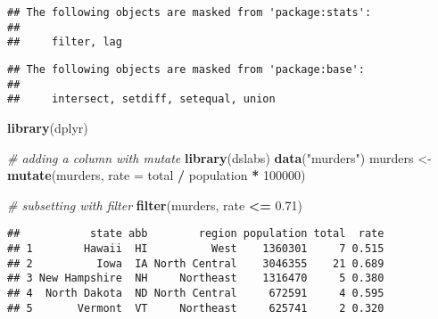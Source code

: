 \documentclass[
]{article}
\newenvironment{Shaded}{\begin{snugshade}}{\end{snugshade}}
\newcommand{\CommentTok}[1]{\textcolor[rgb]{0.56,0.35,0.01}{\textit{#1}}}
\newcommand{\DataTypeTok}[1]{\textcolor[rgb]{0.13,0.29,0.53}{#1}}
\newcommand{\DecValTok}[1]{\textcolor[rgb]{0.00,0.00,0.81}{#1}}
\newcommand{\FloatTok}[1]{\textcolor[rgb]{0.00,0.00,0.81}{#1}}
\newcommand{\KeywordTok}[1]{\textcolor[rgb]{0.13,0.29,0.53}{\textbf{#1}}}
\newcommand{\NormalTok}[1]{#1}
\newcommand{\OperatorTok}[1]{\textcolor[rgb]{0.81,0.36,0.00}{\textbf{#1}}}
\newcommand{\StringTok}[1]{\textcolor[rgb]{0.31,0.60,0.02}{#1}}
\begin{document}
\begin{verbatim}
## The following objects are masked from 'package:stats':
## 
##     filter, lag
\end{verbatim}

\begin{verbatim}
## The following objects are masked from 'package:base':
## 
##     intersect, setdiff, setequal, union
\end{verbatim}

\begin{Shaded}
\begin{Highlighting}[]
\KeywordTok{library}\NormalTok{(dplyr)}

\CommentTok{# adding a column with mutate}
\KeywordTok{library}\NormalTok{(dslabs)}
\KeywordTok{data}\NormalTok{(}\StringTok{"murders"}\NormalTok{)}
\NormalTok{murders <-}\StringTok{ }\KeywordTok{mutate}\NormalTok{(murders, }\DataTypeTok{rate =}\NormalTok{ total }\OperatorTok{/}\StringTok{ }\NormalTok{population }\OperatorTok{*}\StringTok{ }\DecValTok{100000}\NormalTok{)}

\CommentTok{# subsetting with filter}
\KeywordTok{filter}\NormalTok{(murders, rate }\OperatorTok{<=}\StringTok{ }\FloatTok{0.71}\NormalTok{)}
\end{Highlighting}
\end{Shaded}

\begin{verbatim}
##           state abb        region population total  rate
## 1        Hawaii  HI          West    1360301     7 0.515
## 2          Iowa  IA North Central    3046355    21 0.689
## 3 New Hampshire  NH     Northeast    1316470     5 0.380
## 4  North Dakota  ND North Central     672591     4 0.595
## 5       Vermont  VT     Northeast     625741     2 0.320
\end{verbatim}

\begin{Shaded}
\end{Shaded}
\end{document}
